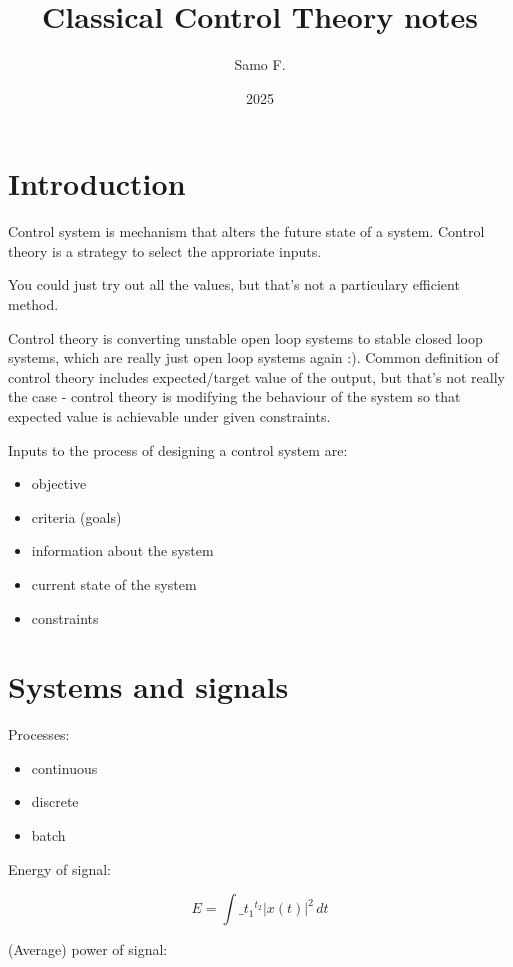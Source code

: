 \documentclass[
]{article}
\title{Classical Control Theory notes}
\author{Samo F.}
\date{2025}
\providecommand{\tightlist}{%
  \setlength{\itemsep}{0pt}\setlength{\parskip}{0pt}}
\begin{document}
\maketitle

\section{Introduction}\label{introduction}

Control system is mechanism that alters the future state of a system.
Control theory is a strategy to select the approriate inputs.

You could just try out all the values, but that's not a particulary
efficient method.

Control theory is converting unstable open loop systems to stable closed
loop systems, which are really just open loop systems again :). Common
definition of control theory includes expected/target value of the
output, but that's not really the case - control theory is modifying the
behaviour of the system so that expected value is achievable under given
constraints.

Inputs to the process of designing a control system are:

\begin{itemize}
\tightlist
\item
  objective
\item
  criteria (goals)
\item
  information about the system
\item
  current state of the system
\item
  constraints
\end{itemize}

\section{Systems and signals}\label{systems-and-signals}

Processes:

\begin{itemize}
\tightlist
\item
  continuous
\item
  discrete
\item
  batch
\end{itemize}

Energy of signal:

\[ E = \int\limits\_{t_1}^{t_2} |x(t)|^2\, dt \]

(Average) power of signal:
\end{document}
